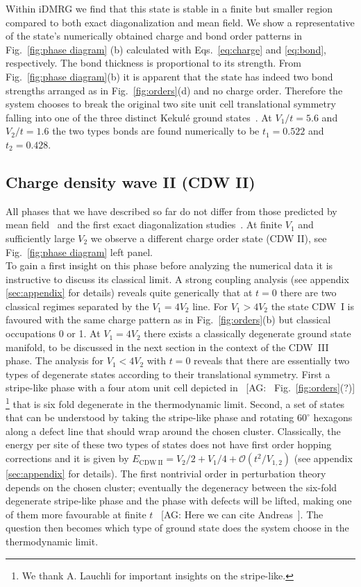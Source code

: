 \documentclass[aps,prx,10pt,twocolumn,floatfix,superscriptaddress,showpacs,numerical,footinbib]{revtex4-1}
\newcommand{\noteAG}[1]{{\color{blue} [AG: #1]}}
\begin{document}
Within iDMRG we find that this state is stable in a finite but smaller region compared to both 
exact diagonalization and mean field.
%
We show a representative of the state's numerically obtained charge and bond order patterns in Fig.~\ref{fig:phase diagram} (b) 
calculated with Eqs.~\eqref{eq:charge} and \eqref{eq:bond}, respectively.
%
The bond thickness is proportional to its strength.
%
From Fig.~\ref{fig:phase diagram}(b) it is apparent that the state has indeed two bond strengths arranged as in Fig.~\ref{fig:orders}(d) 
and no charge order.
%
Therefore the system chooses to break the original two site unit cell translational symmetry 
falling into one of the three distinct Kekul\'{e} ground states~\cite{WF10}. 
%
At $V_{1}/t=5.6$ and $V_{2}/t=1.6$ the two types bonds are found numerically to be 
$t_{1}=0.522$ and $t_{2}=0.428$.

\subsection{Charge density wave II (CDW II)}
%
All phases that we have described so far do not differ
from those predicted by mean field~\cite{RQHZ08,WF10,PR12,GCC13} 
and the first exact diagonalization studies~\cite{GGNVC13,DH14,DCH14}.
%
At finite $V_{1}$ and sufficiently large $V_{2}$ we observe
a different charge order state (CDW II), see Fig.~\ref{fig:phase diagram} left panel.\\
%
To gain a first insight on this phase before analyzing the numerical data it is instructive to discuss its classical limit.
%
A strong coupling analysis (see appendix \ref{sec:appendix} for details) reveals quite generically 
that at $t=0$ there are two classical regimes separated by the $V_{1}=4V_{2}$ line. 
%
For $V_{1}>4V_{2}$ the state CDW~I is favoured with the same charge pattern as in Fig.~\ref{fig:orders}(b) but classical occupations 0 or 1.
%
At $V_{1}=4V_{2}$ there exists a classically degenerate ground state manifold, to be discussed in the next section in the context of the CDW~III phase.
%
The analysis for $V_{1}<4V_{2}$ with $t=0$ reveals that there are essentially two types of degenerate states according to their translational symmetry.
%
First a stripe-like phase with a four atom unit cell depicted in~\noteAG{~Fig.~\ref{fig:orders}(?)} \footnote{We thank A. Lauchli for important insights on the stripe-like.} that is six fold
degenerate in the thermodynamic limit.
%
Second, a set of states that can be understood by taking the stripe-like phase and rotating $60^{\circ}$ hexagons along a defect line that should wrap
around the chosen cluster.
%
Classically, the energy per site of these two types of states does not have first order hopping corrections and it is given by
$E_{\mathrm{CDW~II}} = V_2/2+V_1/4 + \mathcal{O}(t^2/V_{1,2})$ (see appendix \ref{sec:appendix} for details). 
%
The first nontrivial order in perturbation theory depends on the chosen cluster; eventually 
the degeneracy between the six-fold degenerate stripe-like phase and the phase with defects will be lifted, 
making one of them more favourable at finite $t$~\noteAG{Here we can cite Andreas~\cite{Andreas}}.
%
The question then becomes which type of ground state does the system choose in the thermodynamic limit.\\
%
\end{document}
